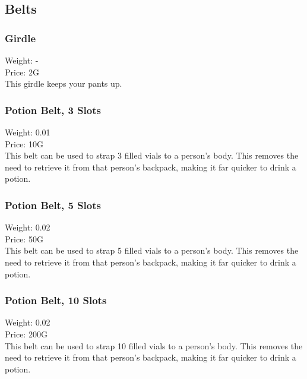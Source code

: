 \subsection{Belts}

\subsubsection{Girdle}
Weight: -\\
Price: 2G\\
This girdle keeps your pants up.

\subsubsection{Potion Belt, 3 Slots}
Weight: 0.01\\
Price: 10G\\
This belt can be used to strap 3 filled vials to a person's body. This removes the need to retrieve it from that person's backpack, making it far quicker to drink a potion.

\subsubsection{Potion Belt, 5 Slots}
Weight: 0.02\\
Price: 50G\\
This belt can be used to strap 5 filled vials to a person's body. This removes the need to retrieve it from that person's backpack, making it far quicker to drink a potion.

\subsubsection{Potion Belt, 10 Slots}
Weight: 0.02\\
Price: 200G\\
This belt can be used to strap 10 filled vials to a person's body. This removes the need to retrieve it from that person's backpack, making it far quicker to drink a potion.



